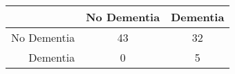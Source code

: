 \begin{table}[ht]
\centering
\begin{tabular}{r|c|c}
  \hline
 & No Dementia & Dementia \\ 
  \hline
No Dementia & 43 & 32 \\ 
  Dementia & 0 & 5 \\ 
   \hline
\end{tabular}
\end{table}
